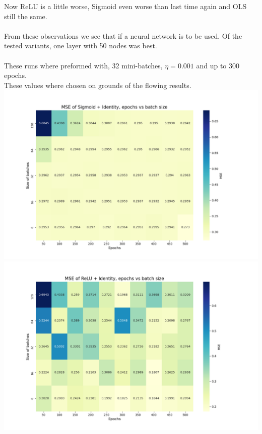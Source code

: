 \documentclass[12pt, letterpaper, twoside]{article}
\begin{document}
Now ReLU is a little worse, Sigmoid even worse than last time again and OLS still the same.\\
\ \\
From these observations we see that if a neural network is to be used. Of the tested variants, one layer with 50 nodes was best.\\
\ \\
These runs where preformed with, 32 mini-batches, $\eta = 0.001$ and up to 300 epochs.\\
These values where chosen on grounds of the flowing results.\\
\includegraphics[scale=0.5]{"epoch_v_batch_sigmoid"}\\
\includegraphics[scale=0.5]{"epoch_v_batch_relu"}\\
\end{document}
